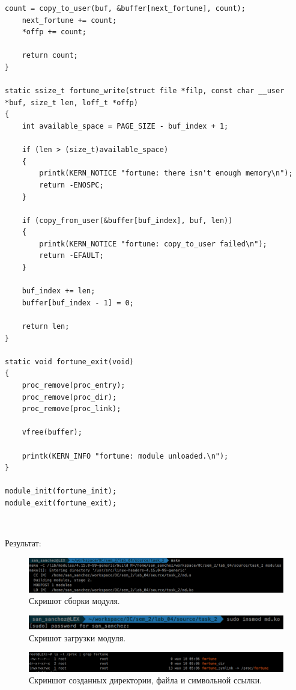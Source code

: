 \begin{lstlisting}[caption=Текст программы второго задания]
    count = copy_to_user(buf, &buffer[next_fortune], count);
    next_fortune += count;
    *offp += count;

    return count;
}

static ssize_t fortune_write(struct file *filp, const char __user *buf, size_t len, loff_t *offp)
{
    int available_space = PAGE_SIZE - buf_index + 1;

    if (len > (size_t)available_space)
    {
        printk(KERN_NOTICE "fortune: there isn't enough memory\n");
        return -ENOSPC;
    }

    if (copy_from_user(&buffer[buf_index], buf, len))
    {
        printk(KERN_NOTICE "fortune: copy_to_user failed\n");
        return -EFAULT;
    }

    buf_index += len;
    buffer[buf_index - 1] = 0;

    return len;
}

static void fortune_exit(void)
{
    proc_remove(proc_entry);
    proc_remove(proc_dir);
    proc_remove(proc_link);

    vfree(buffer);

    printk(KERN_INFO "fortune: module unloaded.\n");
}

module_init(fortune_init);
module_exit(fortune_exit);
\end{lstlisting}

~\

Результат:
\begin{figure}[H]
    \centering
    \includegraphics[scale=0.35]{data/image/task_2_1.png}
    \caption{Скришот сборки модуля.}
\end{figure}

\begin{figure}[H]
    \centering
    \includegraphics[scale=0.4]{data/image/task_2_2.png}
    \caption{Скришот загрузки модуля.}
\end{figure}

\begin{figure}[H]
    \centering
    \includegraphics[scale=0.35]{data/image/task_2_cor_1.png}
    \caption{Скриншот созданных директории, файла и символьной ссылки.}
\end{figure}

